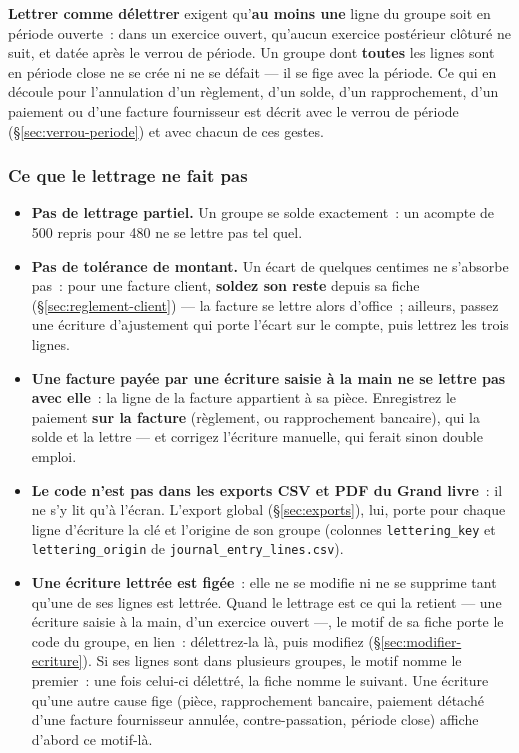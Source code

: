 \documentclass[a4paper,11pt,oneside]{article}
\begin{document}
\textbf{Lettrer comme délettrer} exigent qu'\textbf{au moins une} ligne du groupe soit en
période ouverte~: dans un exercice ouvert, qu'aucun exercice postérieur clôturé ne suit, et
datée après le verrou de période. Un groupe dont \textbf{toutes} les lignes sont en période
close ne se crée ni ne se défait --- il se fige avec la période. Ce qui en découle pour
l'annulation d'un règlement, d'un solde, d'un rapprochement, d'un paiement ou d'une facture
fournisseur est décrit avec le verrou de période (\S\ref{sec:verrou-periode}) et avec chacun
de ces gestes.

\subsubsection{Ce que le lettrage ne fait pas}

\begin{itemize}
    \item \textbf{Pas de lettrage partiel.} Un groupe se solde exactement~: un acompte de 500
          repris pour 480 ne se lettre pas tel quel.
    \item \textbf{Pas de tolérance de montant.} Un écart de quelques centimes ne s'absorbe pas~:
          pour une facture client, \textbf{soldez son reste} depuis sa fiche
          (\S\ref{sec:reglement-client}) --- la facture se lettre alors d'office~; ailleurs,
          passez une écriture d'ajustement qui porte l'écart sur le compte, puis lettrez les trois
          lignes.
    \item \textbf{Une facture payée par une écriture saisie à la main ne se lettre pas avec
          elle}~: la ligne de la facture appartient à sa pièce. Enregistrez le paiement
          \textbf{sur la facture} (règlement, ou rapprochement bancaire), qui la solde et la
          lettre --- et corrigez l'écriture manuelle, qui ferait sinon double emploi.
    \item \textbf{Le code n'est pas dans les exports CSV et PDF du Grand livre}~: il ne s'y
          lit qu'à l'écran. L'export global (\S\ref{sec:exports}), lui, porte pour chaque ligne d'écriture
          la clé et l'origine de son groupe (colonnes \texttt{lettering\_key} et
          \texttt{lettering\_origin} de \texttt{journal\_entry\_lines.csv}).
    \item \textbf{Une écriture lettrée est figée}~: elle ne se modifie ni ne se supprime tant
          qu'une de ses lignes est lettrée. Quand le lettrage est ce qui la retient --- une
          écriture saisie à la main, d'un exercice ouvert ---, le motif de sa fiche porte le code
          du groupe, en lien~: délettrez-la là, puis modifiez (\S\ref{sec:modifier-ecriture}).
          Si ses lignes sont dans plusieurs groupes, le motif nomme le premier~: une fois celui-ci
          délettré, la fiche nomme le suivant. Une écriture qu'une autre cause fige (pièce,
          rapprochement bancaire, paiement détaché d'une facture fournisseur annulée,
          contre-passation, période close) affiche d'abord ce motif-là.
\end{itemize}
\end{document}
